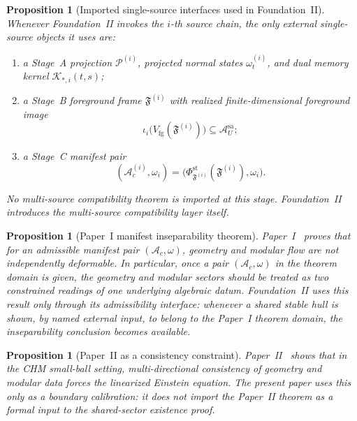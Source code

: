 \documentclass[12pt]{article}
\newtheorem{proposition}[theorem]{Proposition}
\theoremstyle{definition}
\theoremstyle{remark}
\begin{document}
\begin{proposition}[Imported single-source interfaces used in Foundation~II]
\label{prop:appinterfaces}
Whenever Foundation~II invokes the \(i\)-th source chain, the only
external single-source objects it uses are:
\begin{enumerate}
\item a Stage~A projection
  \(\mathcal P^{(i)}\), projected normal states
  \(\omega_t^{(i)}\), and dual memory kernel
  \(\mathcal K_{*,i}(t,s)\);
\item a Stage~B foreground frame \(\mathfrak F^{(i)}\) with realized
  finite-dimensional foreground image
  \[
  \iota_i\bigl(V_{\mathrm{fg}}(\mathfrak F^{(i)})\bigr)
  \subseteq
  \mathcal A_U^{\mathrm{sa}};
  \]
\item a Stage~C manifest pair
  \[
  (\mathcal A_c^{(i)},\omega_i)
  =
  \bigl(\Phi_{\mathfrak F^{(i)}}^{\mathrm{st}}(\mathfrak F^{(i)}),
  \omega_i\bigr).
  \]
\end{enumerate}
No multi-source compatibility theorem is imported at this stage.
Foundation~II introduces the multi-source compatibility layer itself.
\end{proposition}

\begin{proposition}[Paper~I manifest inseparability theorem]
\label{prop:appP1}
Paper~I~\cite{PaperI} proves that for an admissible manifest pair
\((\mathcal A_c,\omega)\), geometry and modular flow are not
independently deformable. In particular, once a pair
\((\mathcal A_c,\omega)\) in the theorem domain is given, the geometry
and modular sectors should be treated as two constrained readings of one
underlying algebraic datum. Foundation~II uses this result only through
its admissibility interface: whenever a shared stable hull is shown, by
named external input, to belong to the Paper~I theorem domain, the
inseparability conclusion becomes available.
\end{proposition}

\begin{proposition}[Paper~II as a consistency constraint]
\label{prop:appP2}
Paper~II~\cite{PaperII} shows that in the CHM small-ball setting,
multi-directional consistency of geometry and modular data forces the
linearized Einstein equation. The present paper uses this only as a
boundary calibration: it does not import the Paper~II theorem as a
formal input to the shared-sector existence proof.
\end{proposition}
\end{document}
